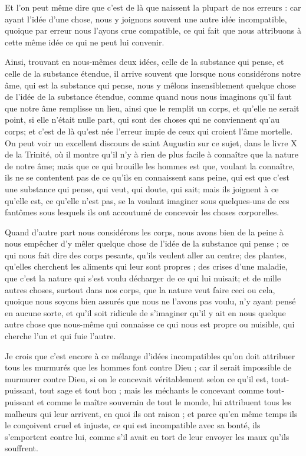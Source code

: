 Et l'on peut même dire que c'est de là que naissent la plupart de nos erreurs : car ayant l'idée d'une chose, nous y joignons souvent une autre idée incompatible, quoique par erreur nous l'ayons crue compatible, ce qui fait que nous attribuons à cette même idée ce qui ne peut lui convenir.

Ainsi, trouvant en nous-mêmes deux idées, celle de la substance qui pense, et celle de la substance étendue, il arrive souvent que lorsque nous considérons notre âme, qui est la substance qui pense, nous y mêlons insensiblement quelque chose de l'idée de la substance étendue, comme quand nous nous imaginons qu'il faut que notre âme remplisse un lieu, ainsi que le remplit un corps, et qu'elle ne serait point, si elle n'était nulle part, qui sont des choses qui ne conviennent qu'au corps; et c'est de là qu'est née l'erreur impie de ceux qui croient l'âme mortelle. On peut voir un excellent discours de saint Augustin sur ce sujet, dans le livre X de la Trinité, où il montre qu'il n'y à rien de plus facile à connaître que la nature de notre âme; mais que ce qui brouille les hommes est que, voulant la connaître, ils ne se contentent pas de ce qu'ils en connaissent sans peine, qui est que c'est une substance qui pense, qui veut, qui doute, qui sait; mais ils joignent à ce qu'elle est, ce qu'elle n'est pas, se la voulant imaginer sous quelques-uns de ces fantômes sous lesquels ils ont accoutumé de concevoir les choses corporelles.

Quand d'autre part nous considérons les corps, nous avons bien de la peine à nous empêcher d'y mêler quelque chose de l'idée de la substance qui pense ; ce qui nous fait dire des corps pesants, qu'ils veulent aller au centre; des plantes, qu'elles cherchent les aliments qui leur sont propres ; des crises d'une maladie, que c'est la nature qui s'est voulu décharger de ce qui lui nuisait; et de mille autres choses, surtout dans nos corps, que la nature veut faire ceci ou cela, quoique nous soyons bien assurés que nous ne l'avons pas voulu, n'y ayant pensé en aucune sorte, et qu'il soit ridicule de s'imaginer qu'il y ait en nous quelque autre chose que nous-même qui connaisse ce qui nous est propre ou nuisible, qui cherche l'un et qui fuie l'autre.

Je crois que c'est encore à ce mélange d'idées incompatibles qu'on doit attribuer tous les murmurés que les hommes font contre Dieu ; car il serait impossible de murmurer contre Dieu, si on le concevait véritablement selon ce qu'il est, tout-puissant, tout sage et tout bon ; mais les méchants le concevant comme tout-puissant et comme le maître souverain de tout le monde, lui attribuent tous les malheurs qui leur arrivent, en quoi ils ont raison ; et parce qu'en même temps ils le conçoivent cruel et injuste, ce qui est incompatible avec sa bonté, ils s'emportent contre lui, comme s'il avait eu tort de leur envoyer les maux qu'ils souffrent.
